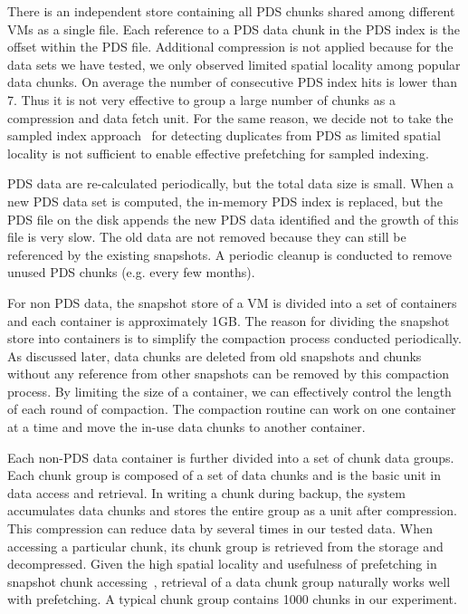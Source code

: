 There is an independent store containing all PDS chunks shared among different VMs as
a single file.
Each reference to a PDS data chunk in the PDS index is the offset within the PDS file.
Additional compression is not applied because 
for the data sets we have tested, we only observed limited spatial locality 
among popular data chunks. On average the number of consecutive PDS index hits is lower than 7.
Thus it is not very effective to group a large number of chunks as a compression and data fetch unit. 
For the same reason, we decide not to take the sampled index approach~\cite{Guo2011} 
for detecting duplicates from PDS as limited spatial locality is not sufficient to enable
effective prefetching for sampled indexing.

PDS data are re-calculated periodically, but 
the total data size is small.  When
a new PDS data  set is computed, the in-memory PDS index is replaced, but 
the PDS file on the disk appends the  new PDS data identified and the growth of this file is very slow. 
The old data are not removed because they can still be referenced by the existing snapshots. 
A periodic cleanup is conducted  to remove unused PDS chunks (e.g. every few months). 


For non PDS data, the snapshot store of a VM is  divided into a set of containers and 
each container is approximately 1GB. 
The reason for dividing the snapshot store into containers is to simplify the compaction process
conducted periodically. As discussed later, data chunks are deleted from old snapshots
and chunks without any reference from other snapshots can be removed by this compaction process.
By limiting the size of a container, we can effectively control the length of each round of compaction.
The compaction  routine can work on one container at a time and move the in-use data chunks to another container. 

Each non-PDS data container is further divided into a set of chunk data groups. Each chunk group is composed of
a set of data chunks and is the basic unit in data access and retrieval. 
In writing a chunk during backup, the system accumulates data chunks and stores the entire
group as a unit after compression. This  compression can reduce data by several times  in our tested data.
When accessing a particular chunk, its chunk group is retrieved from the storage
and decompressed. Given the high spatial locality and usefulness of prefetching  in 
snapshot chunk accessing~\cite{Guo2011,foundation08},
retrieval of  a data chunk  group naturally works well with prefetching. 
A  typical chunk group contains 1000 chunks in our experiment.

